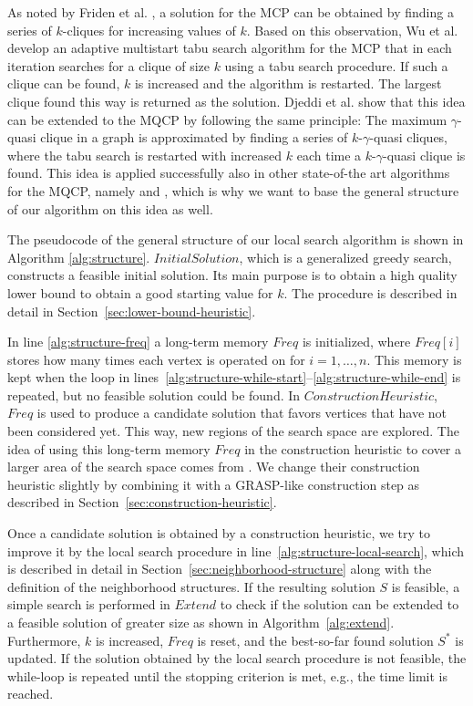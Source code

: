 \documentclass[draft,final]{vutinfth} %
\begin{document}
As noted by Friden et al. \cite{Friden1989}, a solution for the MCP can be obtained by finding a series of $k$-cliques for increasing values of $k$. Based on this observation, Wu et al. \cite{WuH13} develop an adaptive multistart tabu search algorithm for the MCP that in each iteration searches for a clique of size $k$ using a tabu search procedure. If such a clique can be found, $k$ is increased and the algorithm is restarted. The largest clique found this way is returned as the solution. Djeddi et al. \cite{djeddi_extension_2019} show that this idea can be extended to the MQCP by following the same principle: The maximum $\gamma$-quasi clique in a graph is approximated by finding a series of $k$-$\gamma$-quasi cliques, where the tabu search is restarted with increased $k$ each time a $k$-$\gamma$-quasi clique is found. This idea is applied successfully also in other state-of-the art algorithms for the MQCP, namely \cite{zhou_opposition-based_2020} and \cite{chen_nuqclq_2021}, which is why we want to base the general structure of our algorithm on this idea as well. 

The pseudocode of the general structure of our local search algorithm is shown in Algorithm \ref{alg:structure}.
$\mathit{InitialSolution}$, which is a generalized greedy search, constructs a feasible initial solution. Its main purpose is to obtain a high quality lower bound to obtain a good starting value for $k$. The procedure is described in detail in Section~\ref{sec:lower-bound-heuristic}.

In line \ref{alg:structure-freq} a long-term memory $\mathit{Freq}$ is initialized, where $\mathit{Freq[i]}$ stores how many times each vertex is operated on for $i=1,\dots,n$. This memory is kept when the loop in lines~\ref{alg:structure-while-start}--\ref{alg:structure-while-end} is repeated, but no feasible solution could be found. In $\mathit{ConstructionHeuristic}$, $\mathit{Freq}$ is used to produce a candidate solution that favors vertices that have not been considered yet. This way, new regions of the search space are explored. The idea of using this long-term memory $\mathit{Freq}$ in the construction heuristic to cover a larger area of the search space comes from \cite{chen_nuqclq_2021}. We change their construction heuristic slightly by combining it with a GRASP-like construction step as described in Section~\ref{sec:construction-heuristic}. 

Once a candidate solution is obtained by a construction heuristic, we try to improve it by the local search procedure in line~\ref{alg:structure-local-search}, which is described in detail in Section~\ref{sec:neighborhood-structure} along with the definition of the neighborhood structures. If the resulting solution $S$ is feasible, a simple search is performed in $\mathit{Extend}$ to check if the solution can be extended to a feasible solution of greater size as shown in Algorithm~\ref{alg:extend}.
Furthermore, $k$ is increased, $\mathit{Freq}$ is reset, and the best-so-far found solution $S^*$ is updated. 
If the solution obtained by the local search procedure is not feasible, the while-loop is repeated until the stopping criterion is met, e.g., the time limit is reached. 
\end{document}
